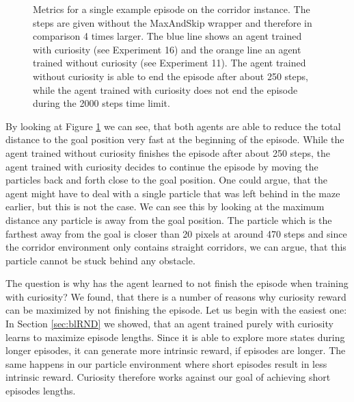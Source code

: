 \begin{figure}[htp]
\begin{center}
\begin{tabular}{c}
        \end{tabular}
    \end{center}
    \caption[Episode metrics on the Corridor Environment]{Metrics for a single example episode on the corridor instance. The steps are given without the MaxAndSkip wrapper and therefore in comparison 4 times larger. The blue line shows an agent trained with curiosity (see Experiment 16) and the orange line an agent trained without curiosity (see Experiment 11). The agent trained without curiosity is able to end the episode after about 250 steps, while the agent trained with curiosity does not end the episode during the 2000 steps time limit.} \label{fig:curiosity_ep_analysis}
\end{figure}


By looking at Figure \ref{fig:curiosity_ep_analysis} we can see, that both agents are able to reduce the total distance to the goal position very fast at the beginning of the episode. While the agent trained without curiosity finishes the episode after about 250 steps, the agent trained with curiosity decides to continue the episode by moving the particles back and forth close to the goal position. One could argue, that the agent might have to deal with a single particle that was left behind in the maze earlier, but this is not the case. We can see this by looking at the maximum distance any particle is away from the goal position. The particle which is the farthest away from the goal is closer than 20 pixels at around 470 steps and since the corridor environment only contains straight corridors, we can argue, that this particle cannot be stuck behind any obstacle. 

The question is why has the agent learned to not finish the episode when training with curiosity? We found, that there is a number of reasons why curiosity reward can be maximized by not finishing the episode. Let us begin with the easiest one: In Section \ref{sec:blRND} we showed, that an agent trained purely with curiosity learns to maximize episode lengths. Since it is able to explore more states during longer episodes, it can generate more intrinsic reward, if episodes are longer. The same happens in our particle environment where short episodes result in less intrinsic reward. Curiosity therefore works against our goal of achieving short episodes lengths. 

